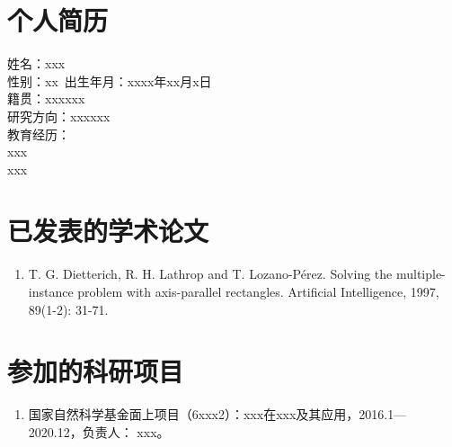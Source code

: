 \documentclass{standalone}
\begin{document}
    
\thesisresume



    
\section*{个人简历}
\noindent 姓名：xxx\\
性别：xx\
出生年月：xxxx年xx月x日\\
籍贯：xxxxxx\\
研究方向：xxxxxx\\
教育经历：\\
xxx\\
xxx

\section*{已发表的学术论文} %
\begin{enumerate}
\renewcommand{\labelenumi}{[\theenumi]}
\item 
T. G. Dietterich, R. H. Lathrop and T. Lozano-Pérez. Solving the multiple-instance problem with axis-parallel rectangles. Artificial Intelligence, 1997, 89(1-2): 31-71.
\end{enumerate}

\section*{参加的科研项目}
\begin{enumerate}
\renewcommand{\labelenumi}{[\theenumi]}
\item 国家自然科学基金面上项目（6xxx2）：xxx在xxx及其应用，2016.1—2020.12，负责人：
xxx。  
\end{enumerate}
\end{document}
